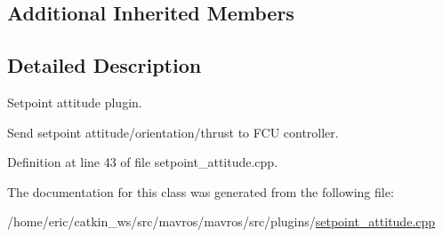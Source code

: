 \subsection*{Additional Inherited Members}


\subsection{Detailed Description}
Setpoint attitude plugin. 

Send setpoint attitude/orientation/thrust to F\+CU controller. 

Definition at line 43 of file setpoint\+\_\+attitude.\+cpp.



The documentation for this class was generated from the following file\+:\begin{DoxyCompactItemize}
\item 
/home/eric/catkin\+\_\+ws/src/mavros/mavros/src/plugins/\mbox{\hyperlink{setpoint__attitude_8cpp}{setpoint\+\_\+attitude.\+cpp}}\end{DoxyCompactItemize}
